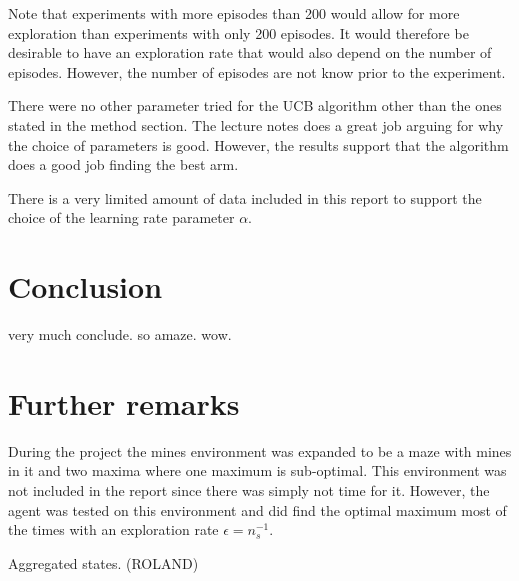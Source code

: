 \documentclass[11pt]{article}
\numberwithin{equation}{section}
\begin{document}
\begin{flushleft}
Note that experiments with more episodes than 200 would allow for more exploration than experiments with only 200 episodes. It would therefore be desirable to have an exploration rate that would also depend on the number of episodes. However, the number of episodes are not know prior to the experiment. \newline

There were no other parameter tried for the UCB algorithm other than the ones stated in the method section. The lecture notes does a great job arguing for why the choice of parameters is good. However, the results support that the algorithm does a good job finding the best arm. \newline

There is a very limited amount of data included in this report to support the choice of the learning rate parameter $\alpha$.

\section{Conclusion}

very much conclude. so amaze. wow.

\section{Further remarks}

During the project the mines environment was expanded to be a maze with mines in it and two maxima where one maximum is sub-optimal. This environment was not included in the report since there was simply not time for it. However, the agent was tested on this environment and did find the optimal maximum most of the times with an exploration rate $\epsilon = n_s^{-1}$. \newline 

Aggregated states. (ROLAND)

\end{flushleft}
\end{document}
